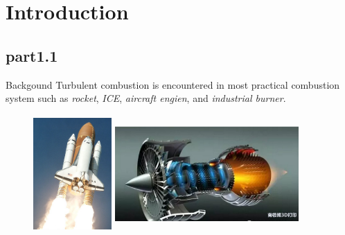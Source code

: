 




\maketitle


\section{Introduction}
	
	\subsection{part1.1}
	
		\begin{xframe}{Backgound}
			Turbulent combustion is encountered in most practical combustion system such as \textit{rocket}, \textit{ICE}, \textit{aircraft engien}, and \textit{industrial burner}.
			\begin{figure}[htbp]\centering
				\begin{minipage}{3.5cm}
					\centering
					\includegraphics[height=4.5cm, width=3cm]{../pic/rocket.jpg}
				\end{minipage}%
				\begin{minipage}{7.5cm}
					\centering
					\includegraphics[height=4.5cm, width=7cm]{../pic/engien.jpg}
				\end{minipage}%
			\end{figure}
		\end{xframe}
	
